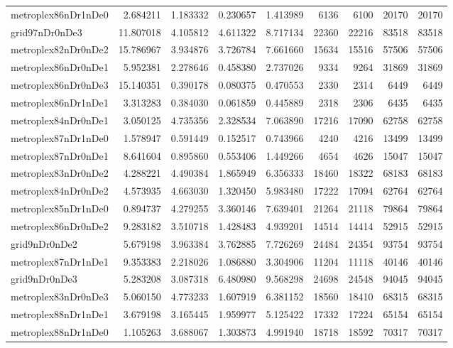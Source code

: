 \begin{longtable}{|l|r|r|r|r|r|r|r|r|}
metroplex86nDr1nDe0 & 2.684211 & 1.183332 & 0.230657 & 1.413989 & 6136 & 6100 & 20170 & 20170 \\
grid97nDr0nDe3 & 11.807018 & 4.105812 & 4.611322 & 8.717134 & 22360 & 22216 & 83518 & 83518 \\
metroplex82nDr0nDe2 & 15.786967 & 3.934876 & 3.726784 & 7.661660 & 15634 & 15516 & 57506 & 57506 \\
metroplex86nDr0nDe1 & 5.952381 & 2.278646 & 0.458380 & 2.737026 & 9334 & 9264 & 31869 & 31869 \\
metroplex86nDr0nDe3 & 15.140351 & 0.390178 & 0.080375 & 0.470553 & 2330 & 2314 & 6449 & 6449 \\
metroplex86nDr1nDe1 & 3.313283 & 0.384030 & 0.061859 & 0.445889 & 2318 & 2306 & 6435 & 6435 \\
metroplex84nDr0nDe1 & 3.050125 & 4.735356 & 2.328534 & 7.063890 & 17216 & 17090 & 62758 & 62758 \\
metroplex87nDr1nDe0 & 1.578947 & 0.591449 & 0.152517 & 0.743966 & 4240 & 4216 & 13499 & 13499 \\
metroplex87nDr0nDe1 & 8.641604 & 0.895860 & 0.553406 & 1.449266 & 4654 & 4626 & 15047 & 15047 \\
metroplex83nDr0nDe2 & 4.288221 & 4.490384 & 1.865949 & 6.356333 & 18460 & 18322 & 68183 & 68183 \\
metroplex84nDr0nDe2 & 4.573935 & 4.663030 & 1.320450 & 5.983480 & 17222 & 17094 & 62764 & 62764 \\
metroplex85nDr1nDe0 & 0.894737 & 4.279255 & 3.360146 & 7.639401 & 21264 & 21118 & 79864 & 79864 \\
metroplex86nDr0nDe2 & 9.283182 & 3.510718 & 1.428483 & 4.939201 & 14514 & 14414 & 52915 & 52915 \\
grid9nDr0nDe2 & 5.679198 & 3.963384 & 3.762885 & 7.726269 & 24484 & 24354 & 93754 & 93754 \\
metroplex87nDr1nDe1 & 9.353383 & 2.218026 & 1.086880 & 3.304906 & 11204 & 11118 & 40146 & 40146 \\
grid9nDr0nDe3 & 5.283208 & 3.087318 & 6.480980 & 9.568298 & 24698 & 24548 & 94045 & 94045 \\
metroplex83nDr0nDe3 & 5.060150 & 4.773233 & 1.607919 & 6.381152 & 18560 & 18410 & 68315 & 68315 \\
metroplex88nDr1nDe1 & 3.679198 & 3.165445 & 1.959977 & 5.125422 & 17332 & 17224 & 65154 & 65154 \\
metroplex88nDr1nDe0 & 1.105263 & 3.688067 & 1.303873 & 4.991940 & 18718 & 18592 & 70317 & 70317 \\

\end{longtable}
